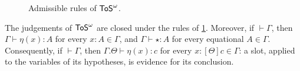 \begin{figure}[tp]
    \centering
    \caption{Admissible rules of $\mathsf{ToS}^\omega$.}
    \label{fig:tos-admissible}
\end{figure}

\begin{proposition}\label{prop:tos-admissible}
    The judgements of $\mathsf{ToS}^\omega$ are closed under the rules of \cref{fig:tos-admissible}. Moreover, if $\vdash \Gamma$, then $\Gamma \vdash \eta(x) : A$ for every $x : A \in \Gamma$, and $\Gamma \vdash \star : A$ for every equational $A \in \Gamma$. Consequently, if $\vdash \Gamma$, then $\Gamma.\Theta \vdash \eta(x) : c$ for every $x : [\Theta]c \in \Gamma$: a slot, applied to the variables of its hypotheses, is evidence for its conclusion.
\end{proposition}

